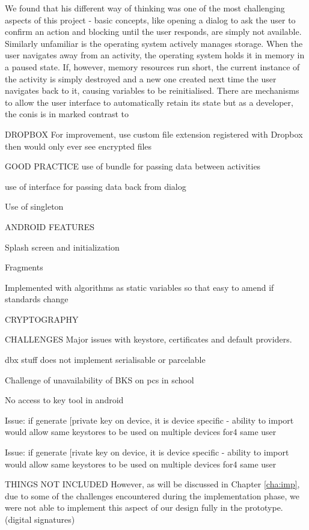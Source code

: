We found that his different way of thinking was one of the most challenging aspects of this project - basic  concepts, like opening a dialog to ask the user to confirm an action and blocking until the user responds, are simply not available.  Similarly unfamiliar is the operating system actively manages storage.  When the user navigates away from an activity, the operating system holds it in memory in a paused state.  If, however, memory resources run short, the current instance of the activity is simply destroyed and a new one created next time the user navigates back to it, causing variables to be reinitialised.  There are mechanisms to allow the user interface to automatically retain its state but as a developer, the conis is in marked contrast to 


DROPBOX
For improvement, use custom file extension registered with Dropbox then would only ever see encrypted files

GOOD PRACTICE
use of bundle for passing data between activities

use of interface for passing data back from dialog

Use of singleton



ANDROID FEATURES

Splash screen and initialization

Fragments

Implemented with algorithms as static variables so that easy to amend if standards change

CRYPTOGRAPHY




CHALLENGES
Major issues with keystore, certificates and default providers.

dbx stuff does not implement serialisable or parcelable


Challenge of unavailability of BKS on pcs in school

No access to key tool in android

Issue: if generate [private key on device, it is device specific - ability to import would allow same keystores to be used on multiple devices for4 same user


Issue: if generate [rivate key on device, it is device specific - ability to import would allow same keystores to be used on multiple devices for4 same user

THINGS NOT INCLUDED
However, as will be discussed in Chapter \ref{cha:imp}, due to some of the challenges encountered during the implementation phase, we were not able to implement this aspect of our design fully in the prototype. (digital signatures)

